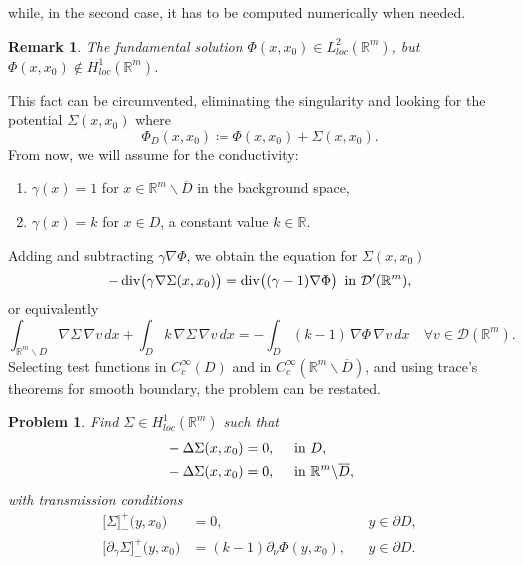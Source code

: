 \documentclass[10pt, a4paper, twoside, openright]{book}
\theoremstyle{definition}
\theoremstyle{plain}
\theoremstyle{plain}
\theoremstyle{plain}
\theoremstyle{plain}
\newtheorem{remark}[subsection]{Remark}
\theoremstyle{plain}
\theoremstyle{plain}
\theoremstyle{plain}
\theoremstyle{plain}
\newtheorem{problem}[subsection]{Problem}
\DeclareMathOperator{\divergence}{div}
\begin{document}
while, in the second case, it has to be computed numerically when needed.
\begin{remark}
 The fundamental solution $\Phi(x,x_0)\in L^2_{loc}(\mathbb{R}^m)$, but $\Phi(x,x_0)\notin H^1_{loc}(\mathbb{R}^m)$.
\end{remark}
This fact can be circumvented, eliminating the singularity and looking for the potential $\Sigma(x,x_0)$ where
\begin{equation}
 \Phi_D(x,x_0)\coloneqq \Phi(x,x_0) + \Sigma(x,x_0).
\end{equation}
From now, we will assume for the conductivity:
\begin{enumerate}
 \item $\gamma(x) = 1$ for $x\in\mathbb{R}^m\backslash\overline{D}$ in the background space,
 \item $\gamma(x) = k$ for $x\in D$, a constant value $k\in \mathbb{R}$.
\end{enumerate}
Adding and subtracting $\gamma\nabla \Phi$, we obtain the equation for $\Sigma(x,x_0)$
\begin{equation}
 -\divergence\bigl(\gamma\nabla \Sigma(x,x_0)\bigr)=\divergence\bigl((\gamma - 1)\nabla\Phi\bigr)\,\textup{ in }\mathcal{D}'(\mathbb{R}^m),
\end{equation}
or equivalently
\begin{equation}
 \int_{\mathbb{R}^m \backslash D}\nabla \Sigma\,\nabla v\, dx + \int_{D} k \, \nabla \Sigma\,\nabla v \, dx = - \int_D(k-1)\,\nabla \Phi\,\nabla v \,dx\quad\forall v \in \mathcal{D}(\mathbb{R}^m).
 \label{eq:variational-F}
\end{equation}
Selecting test functions in $C^\infty_c(D)$ and in $C^\infty_c(\mathbb{R}^m\backslash \overline{D})$, and using trace's theorems for smooth boundary, the problem can be restated.
\begin{problem} Find $\Sigma\in H^1_{loc}(\mathbb{R}^m)$ such that
\begin{align}
 &-\Delta \Sigma(x,x_0) = 0,\quad\textup{ in }D, \label{eq:laplacian-D}\\
 &-\Delta \Sigma(x,x_0) = 0,\quad\textup{ in }\mathbb{R}^m\backslash\overline{D}, \label{eq:laplacian-outside-D}
\end{align}
with \emph{transmission conditions}
\begin{subequations}
\begin{align}
 \bigl[\Sigma\bigr]^+_-\bigl(y,x_0\bigr) &=0, && y \in\partial D, \label{eq:transmissionF0}\\ 
 \bigl[\partial_\gamma \Sigma\bigr]^+_-\bigl(y,x_0\bigr) &= (k - 1)\partial_\nu \Phi(y,x_0), && y \in\partial D. \label{eq:transmissionF1}
\end{align}
\end{subequations}
\end{problem}
\end{document}
